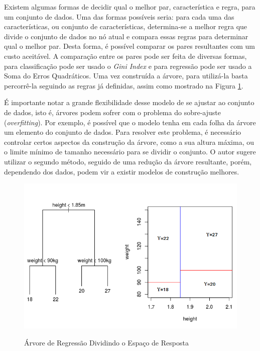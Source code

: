 Existem algumas formas de decidir qual o melhor par, característica e regra, para um conjunto de dados. Uma das formas possíveis seria: para cada uma das características, ou conjunto de características, determina-se a melhor regra que divide o conjunto de dados no nó atual e compara essas regras para determinar qual o melhor par. Desta forma, é possível comparar os pares resultantes com um custo aceitável. A comparação entre os pares pode ser feita de diversas formas, para classificação pode ser usado o \textit{Gini Index} e para regressão pode ser usado a Soma do Erros Quadráticos. Uma vez construída a árvore, para utilizá-la basta percorrê-la seguindo as regras já definidas, assim como mostrado na Figura \ref{figure:tree}.

É importante notar a grande flexibilidade desse modelo de se ajustar ao conjunto de dados, isto é, árvores podem sofrer com o problema do sobre-ajuste (\textit{overfitting}). Por exemplo, é possível que o modelo tenha em cada folha da árvore um elemento do conjunto de dados. Para resolver este problema, é necessário controlar certos aspectos da construção da árvore, como a sua altura máxima, ou o limite mínimo de tamanho necessário para se dividir o conjunto. O autor sugere utilizar o segundo método, seguido de uma redução da árvore resultante, porém, dependendo dos dados, podem vir a existir modelos de construção melhores.
 
 \begin{figure}[htbp]
    \centering
    \includegraphics[scale=0.6]{monography/img/models/regression_tree.png}
    \label{figure:tree}
    \caption[Árvore de Regressão Dividindo o Espaço de Resposta]{Árvore de Regressão Dividindo o Espaço de Resposta\footnotemark}
\end{figure}


